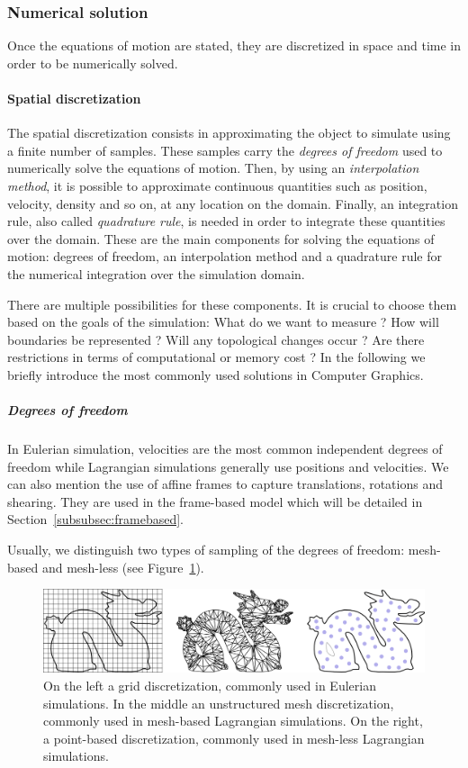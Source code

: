 \subsubsection{Numerical solution}
\label{subsubsec:starMechanics_numericalSolution}
Once the equations of motion are stated, they are discretized in space and time in order to be numerically solved.

\paragraph{Spatial discretization}
The spatial discretization consists in approximating the object to simulate using a finite number of samples. 
These samples carry the \emph{degrees of freedom} used to numerically solve the equations of motion.
Then, by using an \emph{interpolation method}, it is possible to approximate continuous quantities such as position, velocity, density and so on, at any location on the domain. 
Finally, an integration rule, also called \emph{quadrature rule}, is needed in order to integrate these quantities over the domain. 
These are the main components for solving the equations of motion:
degrees of freedom, an interpolation method and a quadrature rule for the numerical integration over the simulation domain.

There are multiple possibilities for these components. It is crucial to choose them based on the goals of the simulation: What do we want to measure ? How will boundaries be represented ? Will any topological changes occur ? Are there restrictions in terms of computational or memory cost ? In the following we briefly introduce the most commonly used solutions in Computer Graphics.

\subparagraph{Degrees of freedom}
In Eulerian simulation, velocities are the most common independent degrees of freedom while Lagrangian simulations generally use positions and velocities. 
We can also mention the use of affine frames to capture translations, rotations and shearing. They are used in the frame-based model which will be detailed in Section~\ref{subsubsec:framebased}.

Usually, we distinguish two types of sampling of the degrees of freedom: mesh-based and mesh-less (see Figure~\ref{fig:discretization}).
\begin{figure}[!h]
	\centering
	\includegraphics[width=\linewidth]{images/continuum_mechanics/discretization.png}
	\caption[STAR mechanics: Discretization]{\label{fig:discretization} On the left a grid discretization, commonly used in Eulerian simulations. In the middle an unstructured mesh discretization, commonly used in mesh-based Lagrangian simulations. On the right, a point-based discretization, commonly used in mesh-less Lagrangian simulations.}
\end{figure}

